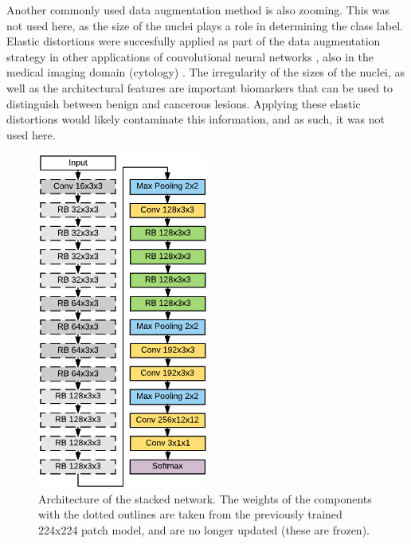 \documentclass[journal]{IEEEtran}
\begin{document}
\medskip

Another commonly used data augmentation method is also zooming. This was not used here, as the size of the nuclei plays a role in determining the class label. Elastic distortions were succesfully applied as part of the data augmentation strategy in other applications of convolutional neural networks \cite{elastransforms}, also in the medical imaging domain (cytology) \cite{unet}. The irregularity of the sizes of the nuclei, as well as the architectural features are important biomarkers that can be used to distinguish between benign and cancerous lesions. Applying these elastic distortions would likely contaminate this information, and as such, it was not used here.

\begin{figure}[!t]
\centering{}
\includegraphics[width=2.2in]{architecture_stacked}
\vspace{-0.15cm}\caption{Architecture of the stacked network. The weights of the components with the dotted outlines are taken from the previously trained 224x224 patch model, and are no longer updated (these are frozen).}
\label{fig_stacked}
\end{figure}
\end{document}
